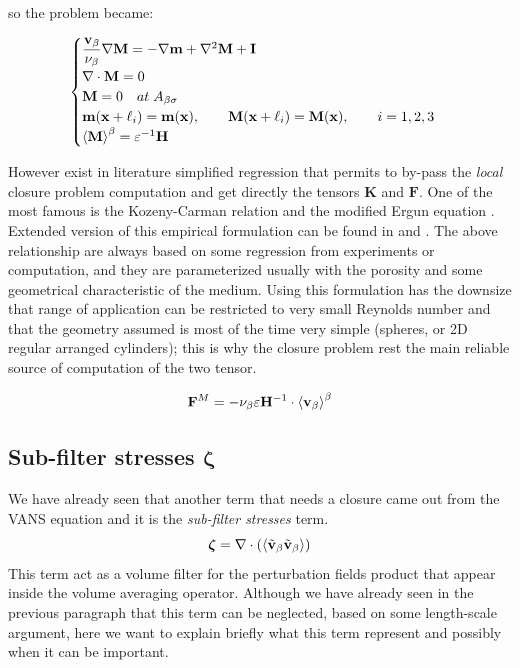 so the problem became:

\begin{eqnarray}
	\begin{cases}
		\dfrac{\textbf{v}_{\beta}}{\nu_{\beta}} \nabla \mathbf{M} = -\nabla \mathbf{m} + \nabla^2 \mathbf{M} +\mathbf{I}\\
		\nabla \cdot \mathbf{M} = 0  \\
		\mathbf{M} = 0 \quad at \; A_{\beta \sigma} \\
		\mathbf{m}(\mathbf{x} +\ell_i) = \mathbf{m}(\mathbf{x}), \qquad \mathbf{M}(\mathbf{x} +\ell_i) = \mathbf{M}(\mathbf{x}), \qquad i=1,2,3 \\
		{\left< \mathbf{M} \right>}^{\beta} = \varepsilon^{-1} \mathbf{H}
	\end{cases}
\label{eq:M_problem}
\end{eqnarray}

However exist in literature simplified regression that permits to by-pass the \textit{local} closure problem computation and get directly the tensors $\mathbf{K}$ and $\mathbf{F}$.
One of the most famous is the Kozeny-Carman \citet{kozeny} relation and the modified Ergun equation \cite{transport2002bird}.
Extended version of this empirical formulation can be found in \citet{zampogna2016fluid} and \cite{yazdchi2012towards}.
The above relationship are always based on some regression from experiments or computation, and they are parameterized usually with the porosity and some geometrical characteristic of the medium.
Using this formulation has the downsize that range of application can be restricted to very small Reynolds number and that the geometry assumed is most of the time very simple (spheres, or 2D regular arranged cylinders); this is why the closure problem rest the main reliable source of computation of the two tensor.

$$\mathbf{F}^M = - \nu_{\beta} \varepsilon \mathbf{H}^{-1} \cdot {\left< \textbf{v}_{\beta}\right>}^{\beta}$$


\subsection{Sub-filter stresses $\boldsymbol{\zeta}$}

We have already seen that another term that needs a closure came out from the VANS equation and it is the \textit{sub-filter stresses} term.
$$\boldsymbol{\zeta} = \nabla \cdot \left({\left< \tilde{\textbf{v}}_{\beta} \tilde{\textbf{v}}_{\beta} \right>}\right)$$
This term act as a volume filter for the perturbation fields product that appear inside the volume averaging operator.
Although we have already seen in the previous paragraph that this term can be neglected, based on some length-scale argument, here we want to explain briefly what this term represent and possibly when it can be important.

